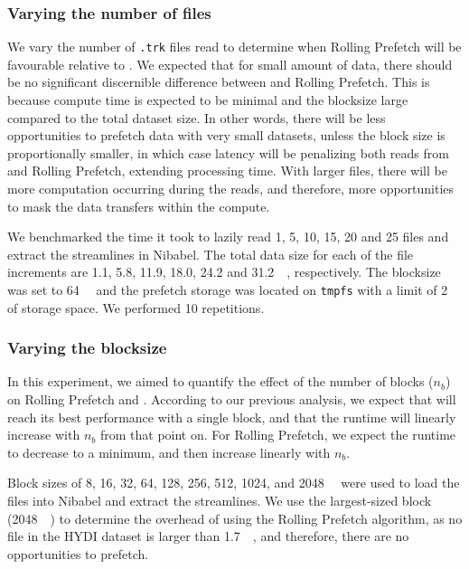 \documentclass[conference]{IEEEtran}
\begin{document}
\subsubsection{Varying the number of files}\label{exp:files}

We vary the number of \texttt{.trk} files read to determine when Rolling Prefetch will be favourable relative to \sfs. We expected that for small amount of data, there should be no significant discernible difference between \sfs and Rolling Prefetch. This is because compute time is
expected to be minimal and the blocksize large compared to the total dataset size. In other words, there
will be less opportunities to prefetch data with very small datasets, unless the block size is proportionally smaller,
in which case latency will be penalizing both reads from \sfs and Rolling Prefetch, extending processing time. With larger files, there will be more computation occurring during the reads, and therefore, more opportunities
to mask the data transfers within the compute.

We benchmarked the time it took to lazily read 1, 5, 10, 15, 20 and 25 files and extract the streamlines in Nibabel.
The total data size for each of the file increments are 1.1, 5.8, 11.9, 18.0, 24.2 and \SI{31.2}{\gibi\byte},
respectively. The blocksize was set to \SI{64}{\mebi\byte} and the prefetch storage was located on \texttt{tmpfs} with
a limit of \SI{2}{\gibi\byte} of storage space. We performed 10 repetitions.

\subsubsection{Varying the blocksize}\label{exp:blocksize}
In this experiment, we aimed to quantify the effect of the number of blocks ($n_b$) on Rolling Prefetch and \sfs. According to our previous analysis, we expect that \sfs will reach its best performance with a single block, and that the runtime will linearly increase with $n_b$ from that point on. For Rolling Prefetch, we expect the runtime to decrease to a minimum, and then increase linearly with $n_b$.


Block sizes of 8, 16, 32, 64, 128, 256, 512, 1024,
and \SI{2048}{\mebi\byte} were used to load the files into Nibabel and extract the streamlines.
We use the 
largest-sized block (\SI{2048}{\mebi\byte}) to determine the
overhead of using the Rolling Prefetch algorithm, as no file in the HYDI dataset is larger than \SI{1.7}{\gibi\byte},
and therefore, there are no opportunities to prefetch.
\end{document}
